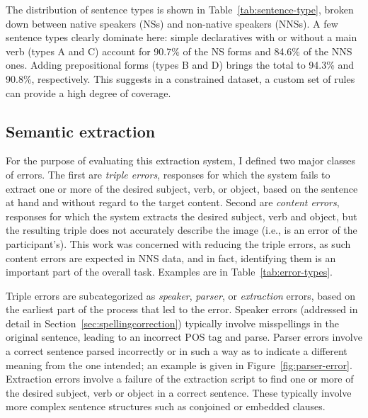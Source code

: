 The distribution of
sentence types is shown in Table~\ref{tab:sentence-type}, broken down
between native speakers (NSs) and non-native speakers (NNSs).  A few
sentence types clearly dominate here: simple
declaratives with or without a main verb (types A and C) account for
90.7\% of the NS forms and 84.6\% of the NNS ones.
Adding prepositional forms (types B and D) brings the
total to 94.3\% and 90.8\%, respectively. This suggests in a constrained dataset, a custom set of rules can provide a high degree of coverage. 

\subsection{Semantic extraction}
\label{sec:eval:extraction}

For the purpose of evaluating this extraction system, I defined two
major classes of errors. The first are \textit{triple errors},
responses for which the system fails to extract one or more of the
desired subject, verb, or object, based on the sentence at hand and
without regard to the target content. Second are \textit{content
  errors}, responses for which the system extracts the desired
subject, verb and object, but the resulting triple does not accurately
describe the image (i.e., is an error of the participant's). This work 
was concerned with reducing the triple errors, as such content errors 
are expected in NNS data, and in fact, identifying them is an important part of the overall task.  Examples are in
Table~\ref{tab:error-types}.

Triple errors are subcategorized as \textit{speaker}, \textit{parser},
or \textit{extraction} errors, based on the earliest part of the
process that led to the error. Speaker errors (addressed in detail in Section~\ref{sec:spellingcorrection}) typically involve
misspellings in the original sentence, leading to an incorrect POS tag
and parse. Parser errors involve a correct sentence parsed incorrectly
or in such a way as to indicate a different meaning from the one
intended; an example is given in
Figure~\ref{fig:parser-error}. Extraction errors involve a failure of
the extraction script to find one or more of the desired subject, verb
or object in a correct sentence. These typically involve more
complex sentence structures such as conjoined or embedded clauses.

